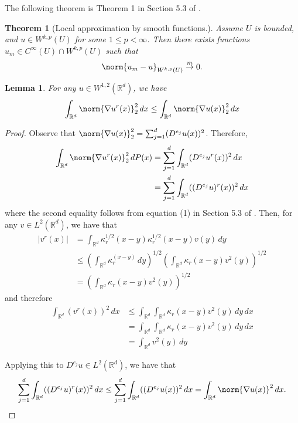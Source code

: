 \documentclass{article}
\newcommand{\Reals}{\mathbb{R}}
\newcommand{\abs}[1]{\left \lvert #1 \right \rvert}
\newcommand{\1}{\mathbf{1}}
\newcommand{\Rd}{\Reals^d}
\theoremstyle{alden}
\theoremstyle{aldenthm}
\newtheorem{theorem}{Theorem}
\newtheorem{lemma}{Lemma}
\theoremstyle{definition}
\theoremstyle{remark}
\begin{document}
The following theorem is Theorem 1 in Section 5.3 of \citep{evans10}.
\begin{theorem}[Local approximation by smooth functions.]
	\label{thm:local_approx_smooth_functions}
	Assume $U$ is bounded, and $u \in W^{k,p}(U)$ for some $1 \leq p < \infty$. Then there exists functions $u_m \in C^{\infty}(U) \cap W^{k,p}(U)$ such that
	\begin{equation*}
	\norm{u_m - u}_{W^{k,p}(U)} \overset{m}{\to} 0.
	\end{equation*}
\end{theorem}

\begin{lemma}
	\label{lem:gradient_mollify_commute}
	For any $u \in W^{1,2}(\Rd)$, we have
	\begin{equation*}
	\int_{\Reals^d} \norm{\nabla u^r(x)}_2^2 \,dx \leq \int_{\Reals^d} \norm{\nabla u(x)}_2^2 \,dx
	\end{equation*}
\end{lemma}
\begin{proof}
	Observe that $\norm{\nabla u(x)}_2^2 = \sum_{j = 1}^{d} (D^{e_j}u(x))^2 $. Therefore,
	\begin{align*}
	\int_{\Rd} \norm{\nabla u^r(x)}_2^2 \,dP(x) & = \sum_{j = 1}^{d} \int_{\Rd} (D^{e_j}u^r(x))^2 \,dx \\
	& = \sum_{j = 1}^{d} \int_{\Rd} ((D^{e_j}u)^r(x))^2 \,dx
	\end{align*}
	where the second equality follows from equation (1) in Section 5.3 of \citep{evans10}. Then, for any $v \in L^2(\Rd)$, we have that
	\begin{align*}
	\abs{v^r(x)} & = \int_{\Rd} \kappa_r^{1/2}(x - y) \kappa_r^{1/2}(x - y) v(y) \,dy \\
	& \leq \left(\int_{\Rd} \kappa_r^(x - y) \,dy\right)^{1/2} \left(\int_{\Rd} \kappa_r(x - y) v^2(y) \right)^{1/2} \\
	& = \left(\int_{\Rd} \kappa_r(x - y) v^2(y) \right)^{1/2}
	\end{align*}
	and therefore
	\begin{align*}
	\int_{\Rd} (v^r(x))^2 \,dx & \leq \int_{\Rd} \int_{\Rd } \kappa_r(x - y) v^2(y) \,dy \,dx \\
	& = \int_{\Rd} \int_{\Rd } \kappa_r(x - y) v^2(y) \,dy \,dx \\
	& = \int_{\Rd} v^2(y) \,dy
	\end{align*}
	
	Applying this to $D^{e_j}u \in L^2(\Rd)$, we have that
	\begin{equation*}
	\sum_{j = 1}^{d} \int_{\Rd} ((D^{e_j}u)^r(x))^2 \,dx \leq \sum_{j = 1}^{d} \int_{\Rd} ((D^{e_j}u(x))^2 \,dx = \int_{\Rd} \norm{\nabla u(x)}^2 \,dx.
	\end{equation*}
\end{proof}



\end{document}
